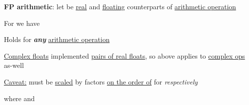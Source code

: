 \textbf{FP arithmetic}: let \iMbox{\ast, \circledast} be \ul{real} and
\ul{floating} counterparts of \ul{arithmetic operation}

\begin{itemize}
      \vItem
            For  we have

            \begin{itemize}
                  \vItem
                        Holds for \textbf{\emph{any}} \ul{arithmetic operation}
                        \iMbox{\circledast = \oplus, \ominus, \otimes, \oslash}
            \end{itemize}
      \vItem
            \ul{Complex floats} implemented \ul{pairs of real floats}, so above applies
            to \ul{complex ops} as-well

            \begin{itemize}
                  \vItem
                        \ul{Caveat:} 
                        must be \ul{scaled} by factors \ul{on the order of} 
                        for \iMbox{\otimes, \oslash} \emph{respectively}
            \end{itemize}
      \vItem
      \vItem
      \vItem
            where
            and

            \begin{itemize}


\end{itemize}
\end{itemize}
